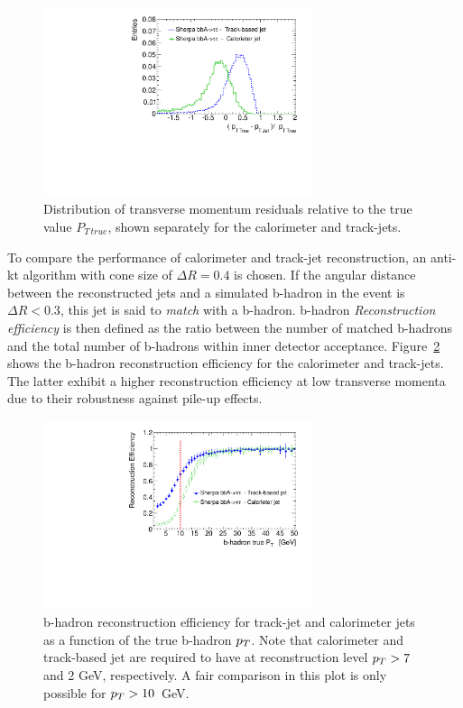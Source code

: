 \begin{figure}[tp]
\centering
\includegraphics[width=0.7\textwidth]{figure/trackjet/residuals2.pdf}
\caption{Distribution of transverse momentum residuals relative to the true value $P_{T \, true}$,
shown separately for the calorimeter and track-jets.}
\label{fig:residuals}
\end{figure}    

To compare the performance of calorimeter and track-jet reconstruction, an anti-kt algorithm with cone size of $\Delta R = 0.4$ is chosen.
If the angular distance between the reconstructed jets and a simulated b-hadron in the event is $\Delta R  < 0.3$,
this jet is said to \emph{match} with a b-hadron. 
 b-hadron \emph{Reconstruction efficiency} is then defined as the ratio between the number of matched b-hadrons
and the total number of b-hadrons within inner detector acceptance. Figure~\ref{fig:recoEff} shows the  
b-hadron reconstruction efficiency for the calorimeter and track-jets. The latter exhibit a higher reconstruction efficiency at low 
transverse momenta due to their robustness against  pile-up effects.
\begin{figure}[tp]
\centering
\includegraphics[width=0.7\textwidth]{figure/trackjet/rec_eff2.pdf}
\caption{b-hadron reconstruction efficiency for track-jet and calorimeter jets  as a 
function of the true b-hadron $p_{T}$. Note that calorimeter  and track-based jet are required to have at 
reconstruction level $p_{T} > 7$ and 2 GeV, respectively. A fair comparison in this plot is only possible
for $p_{T} > 10$~GeV.}
\label{fig:recoEff}
\end{figure}    

